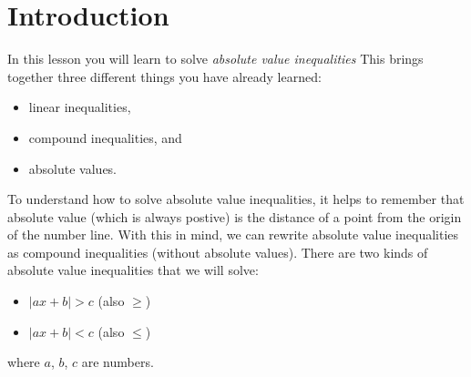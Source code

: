 

\section*{Introduction}


In this lesson you will learn to solve \emph{absolute value inequalities}
This brings together three different things you have already learned:
\begin{itemize}[itemsep=0in]
    \item linear inequalities,
    \item compound inequalities, and
    \item absolute values.
\end{itemize}

To understand how to solve absolute value inequalities,
it helps to remember that absolute value (which is always postive) 
is the distance of a point from the origin of the number line.
With this in mind,
we can rewrite absolute value inequalities as compound inequalities (without absolute values).
There are two kinds of absolute value inequalities that we will solve:
\begin{itemize}
    \item $| ax + b | > c$ \quad(also $\geq$)
    \item $| ax + b | < c$ \quad(also $\leq$)
\end{itemize}
where $a$, $b$, $c$ are numbers.

